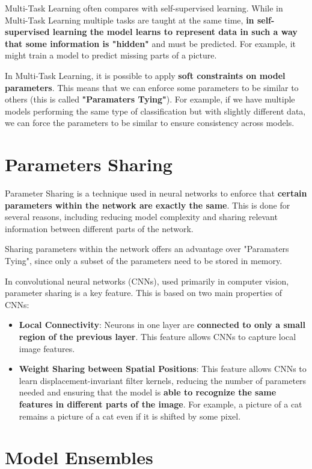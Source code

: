 Multi-Task Learning often compares with self-supervised learning. While in Multi-Task Learning multiple tasks are taught at the same time, \textbf{in self-supervised learning the model learns to represent data in such a way that some information is "hidden"} and must be predicted. For example, it might train a model to predict missing parts of a picture.

In Multi-Task Learning, it is possible to apply \textbf{soft constraints on model parameters}. This means that we can enforce some parameters to be similar to others (this is called \textbf{"Paramaters Tying"}). For example, if we have multiple models performing the same type of classification but with slightly different data, we can force the parameters to be similar to ensure consistency across models.

\section{Parameters Sharing}
\label{c4:parameterSharing}
Parameter Sharing is a technique used in neural networks to enforce that \textbf{certain parameters within the network are exactly the same}. This is done for several reasons, including reducing model complexity and sharing relevant information between different parts of the network.

Sharing parameters within the network offers an advantage over "Paramaters Tying", since only a subset of the parameters need to be stored in memory.

In convolutional neural networks (CNNs), used primarily in computer vision, parameter sharing is a key feature. This is based on two main properties of CNNs:

\begin{itemize}
    \item \textbf{Local Connectivity}: Neurons in one layer are \textbf{connected to only a small region of the previous layer}. This feature allows CNNs to capture local image features.
    \item \textbf{Weight Sharing between Spatial Positions}: This feature allows CNNs to learn displacement-invariant filter kernels, reducing the number of parameters needed and ensuring that the model is \textbf{able to recognize the same features in different parts of the image}. For example, a picture of a cat remains a picture of a cat even if it is shifted by some pixel. 
\end{itemize}

\section{Model Ensembles}

